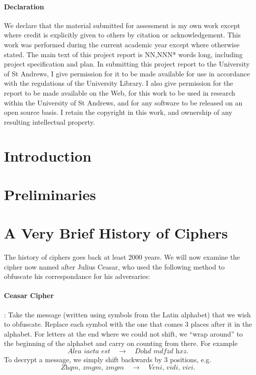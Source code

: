 \documentclass{article}
\theoremstyle{definition}
\begin{document}
\paragraph{Declaration}
We declare that the material submitted for assessment is my own work except where credit is explicitly given to others by citation or acknowledgement. This work was performed during the current academic year except where otherwise stated. The main text of this project report is NN,NNN* words long, including project specification and plan. In submitting this project report to the University of St Andrews, I give permission for it to be made available for use in accordance with the regulations of the University Library. I also give permission for the report to be made available on the Web, for this work to be used in research within the University of St Andrews, and for any software to be released on an open source basis. I retain the copyright in this work, and ownership of any resulting intellectual property.

\newpage

\tableofcontents

\newpage


\section{Introduction}
\section{Preliminaries}
\section{A Very Brief History of Ciphers}
\paragraph{}
The history of ciphers goes back at least 2000 years. We will now examine the
cipher now named after Julius Ceasar, who used the following method to obfuscate
his correspondance for his adversaries:
\paragraph{Ceasar Cipher}: Take the message (written using symbols from the
Latin alphabet) that we wish to obfuscate. Replace each symbol with the one that
comes 3 places after it in the alphabet. For letters at the end where we could
not shift, we ``wrap around'' to the beginning of the alphabet and carry on
counting from there. For example
\[
  \textit{Alea iacta est} \quad\to\quad \textit{Dohd mdfzd hxz}.
\]
To decrypt a message, we simply shift backwards by 3 positions, e.g.
\[
  \textit{Zhqm, zmgm, zmgm} \quad\to\quad \textit{Veni, vidi, vici}.
\]
\end{document}
